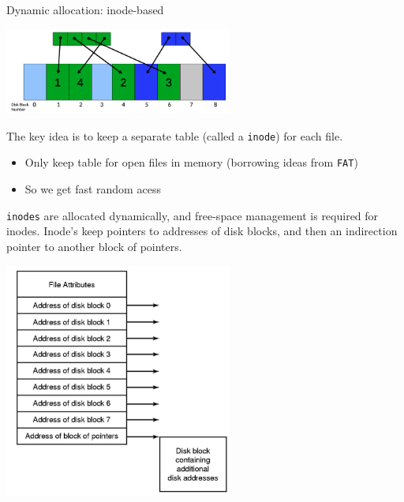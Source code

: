 \documentclass[journal, letterpaper]{IEEEtran}
\begin{document}
\begin{theory}{Dynamic allocation: inode-based}
    \begin{center}
        \includegraphics[width=7.5cm]{./photos/inode_alloc.png}
    \end{center}
    The key idea is to keep a separate table (called a \verb|inode|) for each file.
    \begin{itemize}
        \item Only keep table for open files in memory (borrowing ideas from \verb|FAT|)
        \item So we get fast random acess
    \end{itemize}
    \verb|inodes| are allocated dynamically, and free-space management is required for inodes. Inode's keep pointers to addresses of disk blocks, and then an indirection pointer to another block of pointers.
    \begin{center}
        \includegraphics[width=7.5cm]{./photos/inode_blocks.png}
    \end{center}
\end{theory}
\end{document}
